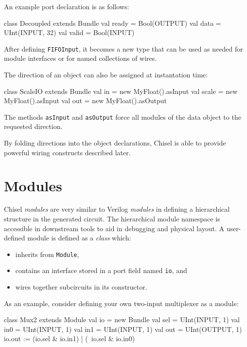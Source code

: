 \documentclass[twocolumn,10pt]{article}
\def\code#1{{\tt #1}}
\begin{document}
An example port declaration is as follows:
\begin{scala}
class Decoupled extends Bundle {
  val ready = Bool(OUTPUT)
  val data  = UInt(INPUT, 32)
  val valid = Bool(INPUT)
}
\end{scala}

\noindent
After defining \code{FIFOInput}, it becomes a new type that can be
used as needed for module interfaces or for named collections of
wires.

The direction of an object can also be assigned at instantation time:
\begin{scala}
class ScaleIO extends Bundle {
  val in    = new MyFloat().asInput
  val scale = new MyFloat().asInput
  val out   = new MyFloat().asOutput
}
\end{scala}

\noindent
The methods \code{asInput} and \code{asOutput} force all modules of
the data object to the requested direction.

By folding directions into the object declarations, Chisel is able to
provide powerful wiring constructs described later.



\section{Modules}

Chisel {\em modules} are very similar to Verilog {\em modules} in
defining a hierarchical structure in the generated circuit.
The hierarchical module namespace is accessible in downstream tools
to aid in debugging and physical layout.  A user-defined module is
defined as a {\em class} which:
\begin{itemize}
\item inherits from \code{Module},
\item contains an interface stored in a port field named \code{io}, and
\item wires together subcircuits in its constructor.
\end{itemize}
As an example, consider defining your own two-input multiplexer as a
module:
\begin{scala}
class Mux2 extends Module {
  val io = new Bundle{
    val sel = UInt(INPUT, 1)
    val in0 = UInt(INPUT, 1)
    val in1 = UInt(INPUT, 1)
    val out = UInt(OUTPUT, 1)
  }
  io.out := (io.sel & io.in1) | (~io.sel & io.in0)
}
\end{scala}
\end{document}
